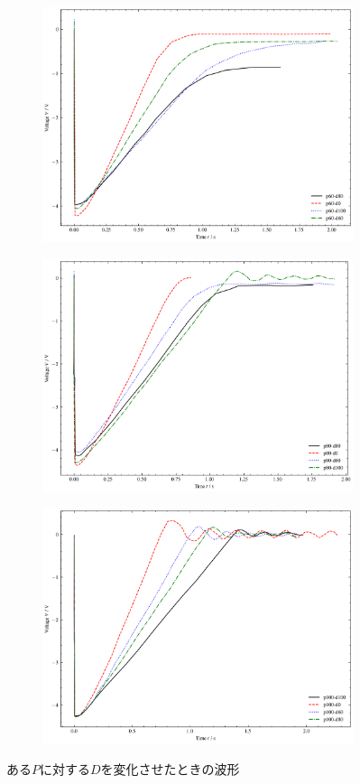 \begin{figure}
	\centering
	\begin{subfigure}{0.48\columnwidth}
		\centering
		\includegraphics[width=0.8\linewidth]{src/figures/oscilloscope-grouped/p-60.png}
	\end{subfigure}
	\begin{subfigure}{0.48\columnwidth}
		\centering
		\includegraphics[width=0.8\linewidth]{src/figures/oscilloscope-grouped/p-80.png}
	\end{subfigure}
	\begin{subfigure}{0.48\columnwidth}
		\centering
		\includegraphics[width=0.8\linewidth]{src/figures/oscilloscope-grouped/p-100.png}
	\end{subfigure}
	\caption{ある$P$に対する$D$を変化させたときの波形}\label{fig:oscilloscope-grouped-p}
\end{figure}
